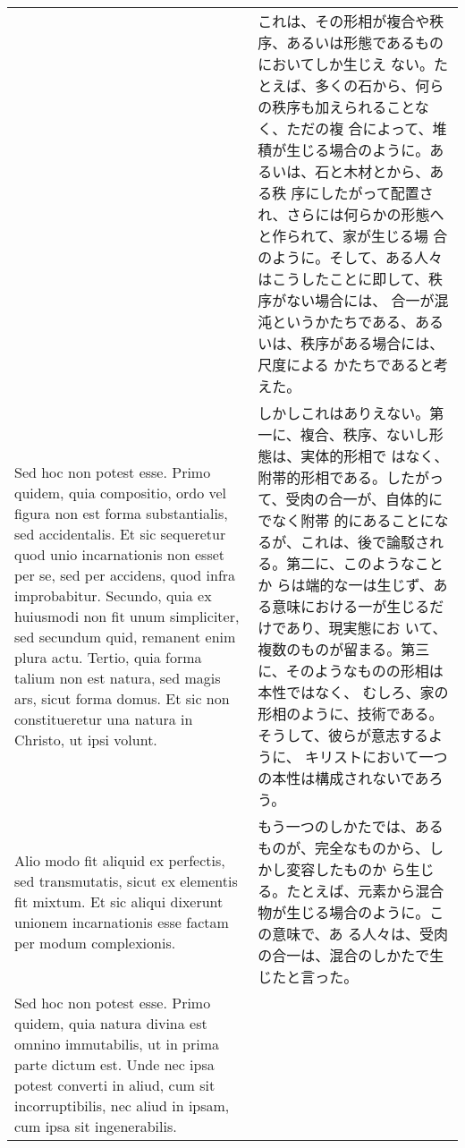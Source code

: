 \documentclass[10pt]{jsarticle} %
\begin{document}
\begin{longtable}{p{21em}p{21em}}
&

これは、その形相が複合や秩序、あるいは形態であるものにおいてしか生じえ
ない。たとえば、多くの石から、何らの秩序も加えられることなく、ただの複
合によって、堆積が生じる場合のように。あるいは、石と木材とから、ある秩
序にしたがって配置され、さらには何らかの形態へと作られて、家が生じる場
合のように。そして、ある人々はこうしたことに即して、秩序がない場合には、
合一が混沌というかたちである、あるいは、秩序がある場合には、尺度による
かたちであると考えた。



\\


Sed hoc non potest esse. Primo quidem, quia compositio, ordo vel
figura non est forma substantialis, sed accidentalis. Et sic
sequeretur quod unio incarnationis non esset per se, sed per accidens,
quod infra improbabitur. Secundo, quia ex huiusmodi non fit unum
simpliciter, sed secundum quid, remanent enim plura actu. Tertio, quia
forma talium non est natura, sed magis ars, sicut forma domus. Et sic
non constitueretur una natura in Christo, ut ipsi volunt.

&

しかしこれはありえない。第一に、複合、秩序、ないし形態は、実体的形相で
はなく、附帯的形相である。したがって、受肉の合一が、自体的にでなく附帯
的にあることになるが、これは、後で論駁される。第二に、このようなことか
らは端的な一は生じず、ある意味における一が生じるだけであり、現実態にお
いて、複数のものが留まる。第三に、そのようなものの形相は本性ではなく、
むしろ、家の形相のように、技術である。そうして、彼らが意志するように、
キリストにおいて一つの本性は構成されないであろう。


\\


Alio modo fit aliquid ex perfectis, sed transmutatis, sicut ex
elementis fit mixtum. Et sic aliqui dixerunt unionem incarnationis
esse factam per modum complexionis.


&

もう一つのしかたでは、あるものが、完全なものから、しかし変容したものか
ら生じる。たとえば、元素から混合物が生じる場合のように。この意味で、あ
る人々は、受肉の合一は、混合のしかたで生じたと言った。


\\


Sed hoc non potest esse. Primo quidem, quia natura divina est omnino
immutabilis, ut in prima parte dictum est. Unde nec ipsa potest
converti in aliud, cum sit incorruptibilis, nec aliud in ipsam, cum
ipsa sit ingenerabilis.



\end{longtable}
\end{document}
